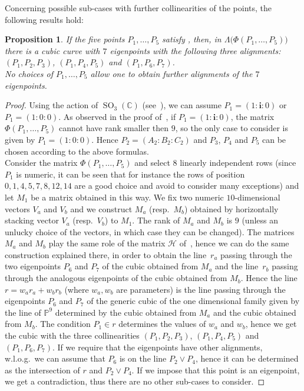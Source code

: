 \documentclass{amsart}
\theoremstyle{plain}
\newtheorem{prop}[lemma]{Proposition}
\theoremstyle{definition}
\newcommand{\C}{\mathbb{C}}
\newcommand{\p}{\mathbb{P}}
\newcommand{\SO}{\operatorname{SO}}
\newcommand{\iii}{\textbf{i}}
\begin{document}
Concerning possible sub-cases with further collinearities of the points,
the following results hold:
\begin{prop}
\label{three_d_three_alignments}
If the five points $P_1, \dots, P_5$ satisfy ,
then, in $\Lambda \bigl( \Phi(P_1, \dotsc, P_5)\bigr)$ there is
a cubic curve with $7$ eigenpoints with the following three alignments:
$(P_1, P_2, P_3)$, $(P_1, P_4, P_5)$ and $(P_1, P_6, P_7)$. \\
No choices of $P_1, \dots, P_5$ allow one to obtain further alignments of the
$7$ eigenpoints.
\end{prop}
%
\begin{proof}
Using the action of $\SO_3(\C)$ (see~),
we can assume $P_1= (1: \iii: 0)$ or $P_1= (1: 0: 0)$. As observed
in the proof of~, if $P_1 = (1: \iii: 0)$,
the matrix
$\Phi(P_1, \dots, P_5)$ cannot have rank smaller then $9$, so the only
case to consider is given by $P_1 = (1: 0: 0)$. Hence
$P_2 = (A_2: B_2: C_2)$ and $P_3$, $P_4$ and $P_5$ can be chosen according 
to the above formulas.\\
Consider the matrix $\Phi(P_1, \dots, P_5)$ and select $8$ linearly independent
rows (since $P_1$ is numeric, it can be seen that for instance the rows
of position $0, 1, 4, 5, 7, 8, 12, 14$ are a good choice and avoid to consider
many exceptions) and let $M_1$ be a matrix obtained in this way.
We fix two numeric $10$-dimensional vectors $V_a$ and $V_b$ and we construct
$M_a$ (resp.\ $M_b$) obtained by horizontally stacking vector
$V_a$ (resp.\ $V_b$)
to $M_1$. The rank of $M_a$ and $M_b$ is $9$ (unless an unlucky choice
of the vectors, in which case they can be changed). The matrices $M_a$ and
$M_b$ play the same role of the matrix $\mathcal{H}$
of~, hence we can do the same construction explained
there, in order to obtain the line~$r_a$ passing through the two
eigenpoints $P_6$ and $P_7$ of the cubic obtained from $M_a$ and the
line~$r_b$ passing through the analogous eigenpoints of the cubic
obtained from $M_b$.
Hence the line $r = w_ar_a+w_br_b$
(where $w_a, w_b$ are parameters) is the line passing through the eigenpoints
$P_6$ and $P_7$
of the generic cubic of the one dimensional family given by the line
of $\p^9$ determined by the cubic obtained from $M_a$ and
the cubic obtained from $M_b$. The condition $P_1 \in r$
determines the values of $w_a$ and $w_b$, hence we get the cubic
with the three collinearities $(P_1, P_2, P_3)$,
$(P_1, P_4, P_5)$ and $(P_1, P_6, P_7)$. If we require that the eigenpoints 
have other alignments, w.l.o.g.\ we can assume that $P_6$ is on the line 
$P_2 \vee P_4$, hence it can be determined as the intersection of $r$
and $P_2 \vee P_4$. If we impose that this point is an eigenpoint, we get
a contradiction, thus there are no other sub-cases to consider.   
\end{proof}
\end{document}
